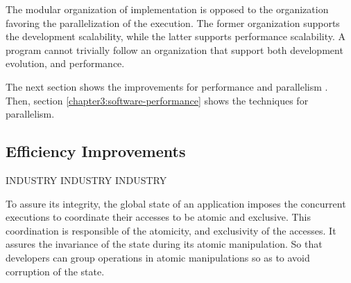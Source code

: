 








The modular organization of implementation is opposed to the organization favoring the parallelization of the execution.
The former organization supports the development scalability, while the latter supports performance scalability.
A program cannot trivially follow an organization that support both development evolution, and performance.

The next section shows the improvements for performance and parallelism .
Then, section \ref{chapter3:software-performance} shows the techniques for parallelism.

\subsection{Efficiency Improvements} \label{chapter3:software-maintainability:performance}

INDUSTRY INDUSTRY INDUSTRY

To assure its integrity, the global state of an application imposes the concurrent executions to coordinate their accesses to be atomic and exclusive.
This coordination is responsible of the atomicity, and exclusivity of the accesses.
It assures the invariance of the state during its atomic manipulation.
So that developers can group operations in atomic manipulations so as to avoid corruption of the state.

